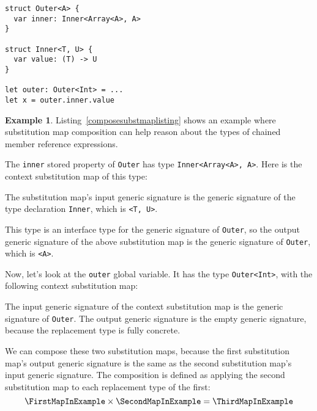 \documentclass[a4paper,headsepline,bibliography=totoc,toc=flat,fleqn,twoside=semi]{scrbook}
\theoremstyle{definition}
\theoremstyle{definition}
\newtheorem{example}{Example}[chapter]
\theoremstyle{definition}
\begin{document}
\begin{listing}\label{composesubstmaplisting}
\begin{Verbatim}
struct Outer<A> {
  var inner: Inner<Array<A>, A>
}

struct Inner<T, U> {
  var value: (T) -> U
}

let outer: Outer<Int> = ...
let x = outer.inner.value
\end{Verbatim}
\end{listing}
\begin{example}\label{composesubstmapexample}
Listing~\ref{composesubstmaplisting} shows an example where substitution map composition can help reason about the types of chained member reference expressions.

The \texttt{inner} stored property of \texttt{Outer} has type \texttt{Inner<Array<A>, A>}. Here is the context substitution map of this type:
\begin{quote}
\FirstMapInExample
\end{quote}
The substitution map's input generic signature is the generic signature of the type declaration \texttt{Inner}, which is \texttt{<T, U>}.

This type is an interface type for the generic signature of \texttt{Outer}, so the output generic signature of the above substitution map is the generic signature of \texttt{Outer}, which is \texttt{<A>}.

Now, let's look at the \texttt{outer} global variable. It has the type \texttt{Outer<Int>}, with the following context substitution map:
\begin{quote}
\SecondMapInExample
\end{quote}
The input generic signature of the context substitution map is the generic signature of \texttt{Outer}. The output generic signature is the empty generic signature, because the replacement type is fully concrete.

We can compose these two substitution maps, because the first substitution map's output generic signature is the same as the second substitution map's input generic signature. The composition is defined as applying the second substitution map to each replacement type of the first:
\[\FirstMapInExample\times\SecondMapInExample = \ThirdMapInExample\]


\end{example}
\end{document}
